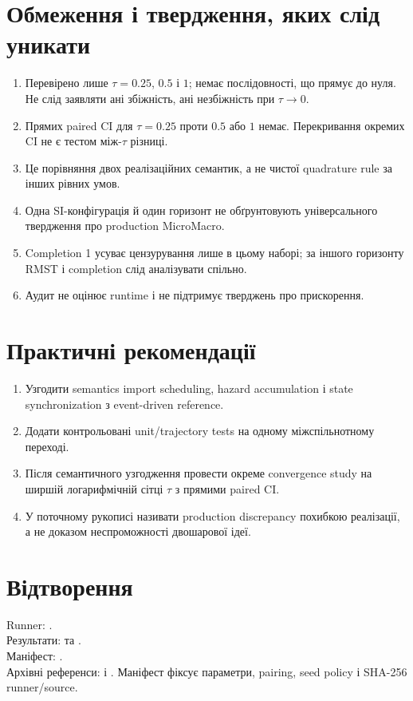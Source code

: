 \documentclass[11pt,a4paper]{article}
\begin{document}
\section{Обмеження і твердження, яких слід уникати}\label{sec:limits}

\begin{enumerate}
  \item Перевірено лише $\tau=0.25$, $0.5$ і $1$; немає послідовності, що
  прямує до нуля. Не слід заявляти ані збіжність, ані незбіжність при
  $\tau\to0$.
  \item Прямих paired CI для $\tau=0.25$ проти $0.5$ або $1$ немає.
  Перекривання окремих CI не є тестом між-$\tau$ різниці.
  \item Це порівняння двох реалізаційних семантик, а не чистої quadrature rule
  за інших рівних умов.
  \item Одна SI-конфігурація й один горизонт не обґрунтовують універсального
  твердження про production MicroMacro.
  \item Completion 1 усуває цензурування лише в цьому наборі; за іншого
  горизонту RMST і completion слід аналізувати спільно.
  \item Аудит не оцінює runtime і не підтримує тверджень про прискорення.
\end{enumerate}

\section{Практичні рекомендації}\label{sec:recommendations}

\begin{enumerate}
  \item Узгодити semantics import scheduling, hazard accumulation і state
  synchronization з event-driven reference.
  \item Додати контрольовані unit/trajectory tests на одному
  міжспільнотному переході.
  \item Після семантичного узгодження провести окреме convergence study на
  ширшій логарифмічній сітці $\tau$ з прямими paired CI.
  \item У поточному рукописі називати production discrepancy похибкою
  реалізації, а не доказом неспроможності двошарової ідеї.
\end{enumerate}

\section{Відтворення}\label{sec:reproduction}

Runner: . \\
Результати: 
та . \\
Маніфест: . \\
Архівні референси: 
і .
Маніфест фіксує параметри, pairing, seed policy і SHA-256 runner/source.
\end{document}
